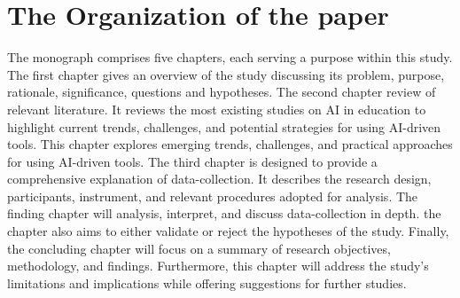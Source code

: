 

\section{The Organization of the paper}\label{sec:the-organization-of-the-paper}
\justifying
The monograph comprises five chapters, each serving a purpose within this study.
The first chapter gives an overview of the study discussing its problem,
purpose, rationale, significance, questions and hypotheses.
The second chapter review of relevant literature.
It reviews the most existing studies on AI in education to highlight current
trends, challenges, and potential strategies for using AI-driven tools.
This chapter explores emerging trends, challenges, and practical approaches for using AI-driven tools.
The third chapter is designed to provide a comprehensive explanation of data-collection.
It describes the research design, participants, instrument, and relevant procedures
adopted for analysis.
The finding chapter will analysis, interpret, and discuss data-collection in depth.
the chapter also aims to either validate or reject the hypotheses of the study.
Finally, the concluding chapter will focus on a summary of research objectives, methodology, and findings.
Furthermore,
this chapter will address the study's limitations and implications while offering suggestions for further studies.







